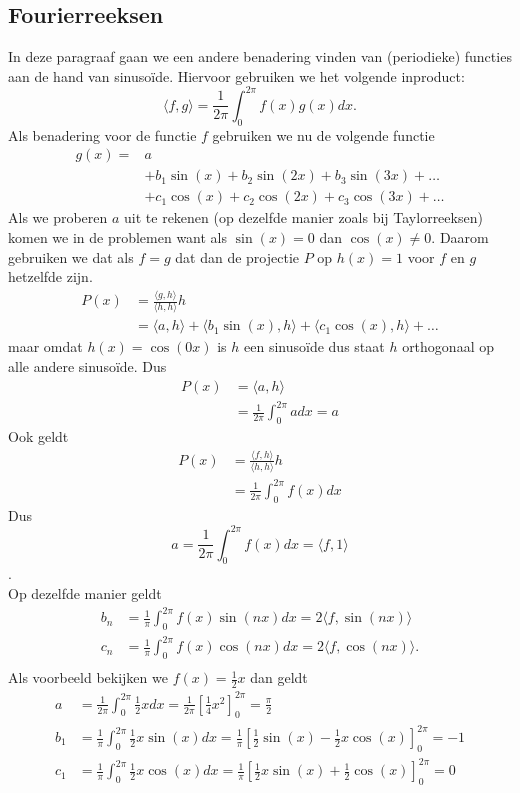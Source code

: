 \documentclass[../main.tex]{subfiles}
\begin{document}
\subsection*{Fourierreeksen}
In deze paragraaf gaan we een andere benadering vinden van (periodieke) functies aan de hand van sinusoïde. Hiervoor gebruiken we het volgende inproduct: \[\langle f,g\rangle=\frac{1}{2\pi}\int_{0}^{2\pi} f(x)g(x)dx.\]
Als benadering voor de functie $f$ gebruiken we nu de volgende functie 
\begin{align*}
    g(x)=&a\\
    &+b_1\sin(x)+b_2\sin(2x)+b_3\sin(3x)+\ldots\\
    &+c_1\cos(x)+c_2\cos(2x)+c_3\cos(3x)+\ldots
\end{align*}
Als we proberen $a$ uit te rekenen (op dezelfde manier zoals bij Taylorreeksen) komen we in de problemen want als $\sin(x)=0$ dan $\cos(x)\neq 0$. 
Daarom gebruiken we dat als $f=g$ dat dan de projectie $P$ op $h(x)=1$ voor $f$ en $g$ hetzelfde zijn.
\begin{align*}
    P(x)&=\frac{\langle g,h\rangle}{\langle h,h\rangle}h\\
    &=\langle a,h\rangle+\langle b_1\sin(x),h\rangle+\langle c_1\cos(x),h\rangle+\ldots
\end{align*}
maar omdat $h(x)=\cos(0x)$ is $h$ een sinusoïde dus staat $h$ orthogonaal op alle andere sinusoïde. Dus\\
\begin{align*}
    P(x)&=\langle a,h\rangle\\
    &=\frac{1}{2\pi}\int_0^{2\pi}adx=a
\end{align*}
Ook geldt \begin{align*}
    P(x)&=\frac{\langle f,h\rangle}{\langle h,h\rangle}h\\
    &=\frac{1}{2\pi}\int_0^{2\pi}f(x)dx
\end{align*}
Dus $$a=\frac{1}{2\pi}\int_0^{2\pi}f(x)dx=\langle f,1\rangle$$.\\
Op dezelfde manier geldt\begin{align*}
     b_n&=\frac{1}{\pi}\int_0^{2\pi}f(x)\sin(nx)dx=2\langle f,\sin(nx)\rangle\\ c_n&=\frac{1}{\pi}\int_0^{2\pi}f(x)\cos(nx)dx=2\langle f,\cos(nx)\rangle.\\
     \end{align*}
Als voorbeeld bekijken we $f(x)=\frac{1}{2}x$ dan geldt 
\begin{align*}
    a&=\frac{1}{2\pi}\int_0^{2\pi}\frac{1}{2}xdx=\frac{1}{2\pi}\left[\frac{1}{4}x^2\right]_0^{2\pi}=\frac{\pi}{2}\\
    b_1&=\frac{1}{\pi}\int_0^{2\pi}\frac{1}{2}x\sin(x)dx=\frac{1}{\pi}\left[\frac{1}{2}\sin(x)-\frac{1}{2}x\cos(x)\right]_0^{2\pi}=-1\\
    c_1&=\frac{1}{\pi}\int_0^{2\pi}\frac{1}{2}x\cos(x)dx=\frac{1}{\pi}\left[\frac{1}{2}x\sin(x)+\frac{1}{2}\cos(x)\right]_0^{2\pi}=0
\end{align*}
\end{document}
